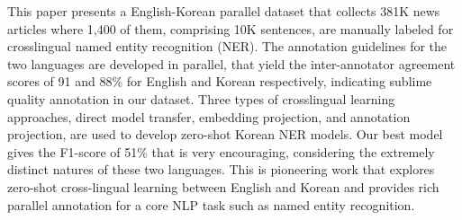 This paper presents a English-Korean parallel dataset that collects 381K news articles where 1,400 of them, comprising 10K sentences, are manually labeled for crosslingual named entity recognition (NER). The annotation guidelines for the two languages are developed in parallel, that yield the inter-annotator agreement scores of 91 and 88\% for English and Korean respectively, indicating sublime quality annotation in our dataset. Three types of crosslingual learning approaches, direct model transfer, embedding projection, and annotation projection, are used to develop zero-shot Korean NER models. Our best model gives the F1-score of 51\% that is very encouraging, considering the extremely distinct natures of these two languages. This is pioneering work that explores zero-shot cross-lingual learning between English and Korean and provides rich parallel annotation for a core NLP task such as named entity recognition.
